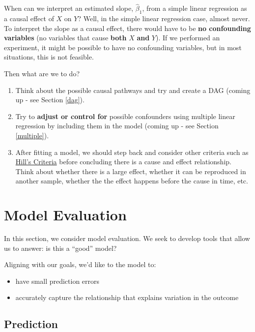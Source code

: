 \documentclass[
]{book}
\providecommand{\tightlist}{%
  \setlength{\itemsep}{0pt}\setlength{\parskip}{0pt}}
\begin{document}
When can we interpret an estimated slope, \(\hat{\beta}_1\), from a simple linear regression as a causal effect of \(X\) on \(Y\)? Well, in the simple linear regression case, almost never. To interpret the slope as a causal effect, there would have to be \textbf{no confounding variables} (no variables that cause \textbf{both} \(X\) \textbf{and} \(Y\)). If we performed an experiment, it might be possible to have no confounding variables, but in most situations, this is not feasible.

Then what are we to do?

\begin{enumerate}
\def\labelenumi{\arabic{enumi}.}
\tightlist
\item
  Think about the possible causal pathways and try and create a DAG (coming up - see Section \ref{dag}).
\item
  Try to \textbf{adjust or control for} possible confounders using multiple linear regression by including them in the model (coming up - see Section \ref{multiple}).
\item
  After fitting a model, we should step back and consider other criteria such as \href{https://en.wikipedia.org/wiki/Bradford_Hill_criteria}{Hill's Criteria} before concluding there is a cause and effect relationship. Think about whether there is a large effect, whether it can be reproduced in another sample, whether the the effect happens before the cause in time, etc.
\end{enumerate}

\hypertarget{model-evaluation}{%
\section{Model Evaluation}\label{model-evaluation}}

In this section, we consider model evaluation. We seek to develop tools that allow us to answer: is this a ``good'' model?

Aligning with our goals, we'd like to the model to:

\begin{itemize}
\tightlist
\item
  have small prediction errors
\item
  accurately capture the relationship that explains variation in the outcome
\end{itemize}

\hypertarget{prediction}{%
\subsection{Prediction}\label{prediction}}
\end{document}
